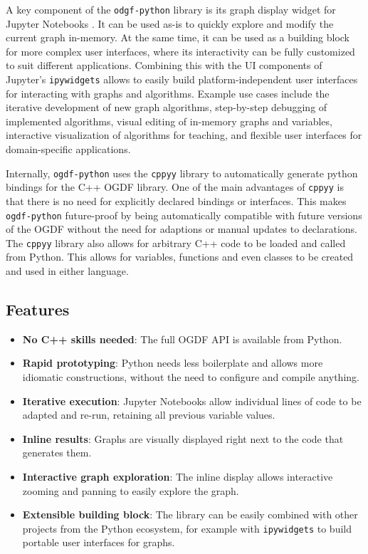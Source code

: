 \documentclass{llncs}
\begin{document}
A key component of the \texttt{odgf-python} library is its graph display widget for Jupyter Notebooks \cite{str-agw-22}.
It can be used as-is to quickly explore and modify the current graph in-memory.
At the same time, it can be used as a building block for more complex user interfaces, where its interactivity can be fully customized to suit different applications.
Combining this with the UI components of Jupyter's \texttt{ipywidgets} allows to easily build platform-independent user interfaces for interacting with graphs and algorithms.
Example use cases include the iterative development of new graph algorithms,
step-by-step debugging of implemented algorithms,
visual editing of in-memory graphs and variables,
interactive visualization of algorithms for teaching, and 
flexible user interfaces for domain-specific applications.

Internally, \texttt{ogdf-python} uses the \texttt{cppyy} library \cite{ld-hpp-16,kvl-eaa-23} to automatically generate python bindings for the C++ OGDF library.
One of the main advantages of \texttt{cppyy} is that there is no need for explicitly declared bindings or interfaces.
This makes \texttt{ogdf-python} future-proof by being automatically compatible with future versions of the OGDF without the need for adaptions or manual updates to declarations.
The \texttt{cppyy} library also allows for arbitrary C++ code to be loaded and called from Python.
This allows for variables, functions and even classes to be created and used in either language.

\subsection*{Features}
\begin{itemize}
\item \textbf{No C++ skills needed}: The full OGDF API is available from Python.
\item \textbf{Rapid prototyping}: Python needs less boilerplate and allows more idiomatic constructions, 
  without the need to configure and compile anything.
\item \textbf{Iterative execution}: Jupyter Notebooks allow individual lines of code to be adapted and re-run,
  retaining all previous variable values.
\item \textbf{Inline results}: Graphs are visually displayed right next to the code that generates them.
\item \textbf{Interactive graph exploration}: The inline display allows interactive zooming and panning to easily explore the graph.
\item \textbf{Extensible building block}: The library can be easily combined with other projects from the Python ecosystem, for example with \texttt{ipywidgets} to build portable user interfaces for graphs.
\end{itemize}
\end{document}
